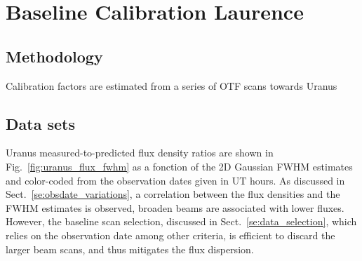 \section{Baseline Calibration {\color{blue} Laurence} }

\subsection{Methodology}
Calibration factors are estimated from a series of OTF scans towards Uranus

\subsection{Data sets}


Uranus measured-to-predicted flux density ratios are shown in Fig.~\ref{fig:uranus_flux_fwhm} as a fonction of the 2D Gaussian FWHM estimates and color-coded from the observation dates given in UT hours. As discussed in Sect.~\ref{se:obsdate_variations}, a correlation between the flux densities and the FWHM estimates is observed, broaden beams are associated with lower fluxes. However, the baseline scan selection, discussed in Sect.~\ref{se:data_selection}, which relies on the observation date among other criteria, is efficient to discard the larger beam scans, and thus mitigates the flux dispersion.          


